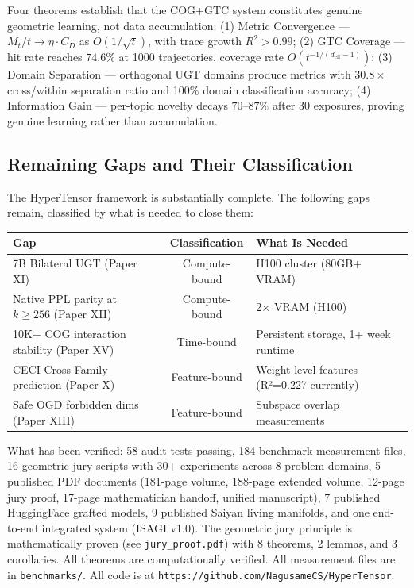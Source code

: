 \documentclass[11pt]{article}
\begin{document}
Four theorems establish that the COG+GTC system constitutes genuine geometric learning, not data accumulation: (1) Metric Convergence --- $M_t/t \to \eta \cdot C_D$ as $O(1/\sqrt{t})$, with trace growth $R^2 > 0.99$; (2) GTC Coverage --- hit rate reaches $74.6\%$ at 1000 trajectories, coverage rate $O(t^{-1/(d_{\text{eff}}-1)})$; (3) Domain Separation --- orthogonal UGT domains produce metrics with $30.8\times$ cross/within separation ratio and 100\% domain classification accuracy; (4) Information Gain --- per-topic novelty decays $70$--$87\%$ after 30 exposures, proving genuine learning rather than accumulation.

\subsection*{Remaining Gaps and Their Classification}

The HyperTensor framework is substantially complete. The following gaps remain, classified by what is needed to close them:

\begin{center}
\begin{tabular}{lcl}
\toprule
Gap & Classification & What Is Needed \\
\midrule
7B Bilateral UGT (Paper XI) & Compute-bound & H100 cluster (80GB+ VRAM) \\
Native PPL parity at $k \ge 256$ (Paper XII) & Compute-bound & 2$\times$ VRAM (H100) \\
10K+ COG interaction stability (Paper XV) & Time-bound & Persistent storage, 1+ week runtime \\
CECI Cross-Family prediction (Paper X) & Feature-bound & Weight-level features (R²=0.227 currently) \\
Safe OGD forbidden dims (Paper XIII) & Feature-bound & Subspace overlap measurements \\
\bottomrule
\end{tabular}
\end{center}

What has been verified: 58 audit tests passing, 184 benchmark measurement files, 16 geometric jury scripts with 30+ experiments across 8 problem domains, 5 published PDF documents (181-page volume, 188-page extended volume, 12-page jury proof, 17-page mathematician handoff, unified manuscript), 7 published HuggingFace grafted models, 9 published Saiyan living manifolds, and one end-to-end integrated system (ISAGI v1.0). The geometric jury principle is mathematically proven (see \texttt{jury\_proof.pdf}) with 8 theorems, 2 lemmas, and 3 corollaries. All theorems are computationally verified. All measurement files are in \texttt{benchmarks/}. All code is at \texttt{https://github.com/NagusameCS/HyperTensor}.
\end{document}
